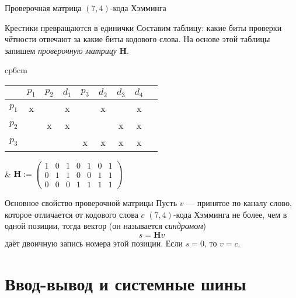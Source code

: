 \begin{frame}{Проверочная матрица $(7,4)$-кода Хэмминга}
\small
\begin{block}{Крестики превращаются в единички}
Составим таблицу: какие биты проверки чётности отвечают за какие биты кодового слова. На основе этой таблицы запишем \emph{проверочную матрицу} $\mathbf{H}$.

\begin{tabular}{cp{6cm}}
    \begin{tabular}{r|cccccccc}
    \toprule
       & $p_1$ & $p_2$ & $d_1$ & $p_3$ & $d_2$ & $d_3$ & $d_4$ \\
    \midrule
    $p_1$ & x  &    & x  &    & x  &    & x \\
    $p_2$ &    & x  & x  &    &    & x  & x \\
    $p_3$ &    &    &    & x  & x  & x  & x \\
    \bottomrule
    \end{tabular}
&
    $
        \mathbf{H} := \begin{pmatrix}
            1 & 0 & 1 & 0 & 1 & 0 & 1\\
            0 & 1 & 1 & 0 & 0 & 1 & 1\\
            0 & 0 & 0 & 1 & 1 & 1 & 1
        \end{pmatrix}
    $
\end{tabular}%
\end{block}

\begin{block}{Основное свойство проверочной матрицы}
Пусть $v$ — принятое по каналу слово,  которое отличается от кодового слова $c$ $(7,4)$-кода Хэмминга не более, чем в одной позиции, тогда вектор (он называется \emph{синдромом})
\[
    s = \mathbf{H}v
\]
даёт двоичную запись номера этой позиции. Если $s=0$, то $v=c$.
\end{block}

\end{frame}

\section{Ввод-вывод и системные шины}

